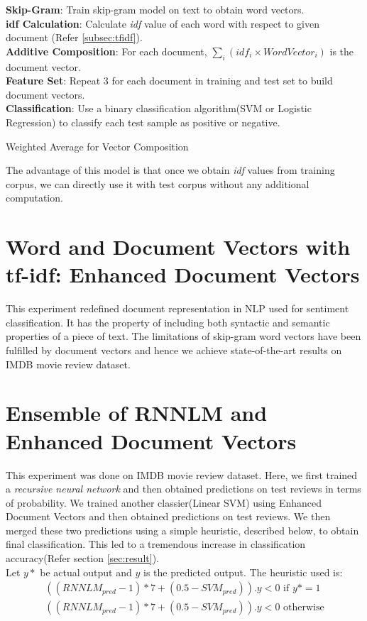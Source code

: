 \LinesNumbered
\begin{algorithm}[H]
\large
\textbf{Skip-Gram}: Train skip-gram model on text to obtain word vectors.\\
\textbf{idf Calculation}: Calculate \emph{idf} value of each word with respect to given document (Refer \ref{subsec:tfidf}).\\
\textbf{Additive Composition}: For each document, $\sum_{i}(idf_i \times WordVector_i)$ is the document vector.\\
\textbf{Feature Set}: Repeat 3 for each document in training and test set to build document vectors.\\
\textbf{Classification}: Use a binary classification algorithm(SVM or Logistic Regression) to classify each test sample as positive or negative.
\caption{Weighted Average for Vector Composition}\label{alg:weighted_average}
\end{algorithm}
The advantage of this model is that once we obtain \emph{idf} values from training corpus, we can directly use it with test corpus without any additional computation.

\section{Word and Document Vectors with tf-idf: Enhanced Document Vectors}
This experiment redefined document representation in NLP used for sentiment classification. It has the property of including both syntactic and semantic properties of a piece of text. The limitations of skip-gram word vectors have been fulfilled by document vectors and hence we achieve state-of-the-art results on IMDB movie review dataset.

\section{Ensemble of RNNLM and Enhanced Document Vectors}
This experiment was done on IMDB movie review dataset. Here, we first trained a \emph{recursive neural network} and then obtained predictions on test reviews in terms of probability. We trained another classier(Linear SVM) using Enhanced Document Vectors and then obtained predictions on test reviews. We then merged these two predictions using a simple heuristic, described below, to obtain final classification. This led to a tremendous increase in classification accuracy(Refer section \ref{sec:result}).\\
Let $y*$ be actual output and $y$ is the predicted output. The heuristic used is:
\begin{align}
((RNNLM_{pred}-1)*7+(0.5-SVM_{pred})).y<0 \text{  if } y*=1\\
((RNNLM_{pred}-1)*7+(0.5-SVM_{pred})).y<0 \text{  otherwise}
\end{align}

